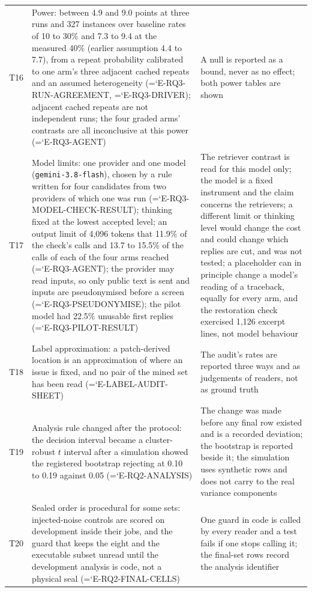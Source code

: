 \documentclass[10pt,twocolumn]{article}
\newcommand{\entry}[1]{{\ttfamily\hyphenchar\font=`\-\relax #1}}
\begin{document}
\begin{table}[t]
\begin{tabular}{@{}p{}p{}p{}@{}}
T16 & Power: between 4.9 and 9.0 points at three runs and 327 instances over baseline rates of 10 to 30\% and 7.3 to 9.4 at the measured 40\% (earlier assumption 4.4 to 7.7), from a repeat probability calibrated to one arm's three adjacent cached repeats and an assumed heterogeneity (\entry{E-RQ3-RUN-AGREEMENT}, \entry{E-RQ3-DRIVER}); adjacent cached repeats are not independent runs; the four graded arms' contrasts are all inconclusive at this power (\entry{E-RQ3-AGENT}) & A null is reported as a bound, never as no effect; both power tables are shown \\
T17 & Model limits: one provider and one model (\texttt{gemini-3.8-flash}), chosen by a rule written for four candidates from two providers of which one was run (\entry{E-RQ3-MODEL-CHECK-RESULT}); thinking fixed at the lowest accepted level; an output limit of 4,096 tokens that 11.9\% of the check's calls and 13.7 to 15.5\% of the calls of each of the four arms reached (\entry{E-RQ3-AGENT}); the provider may read inputs, so only public text is sent and inputs are pseudonymised before a screen (\entry{E-RQ3-PSEUDONYMISE}); the pilot model had 22.5\% unusable first replies (\entry{E-RQ3-PILOT-RESULT}) & The retriever contrast is read for this model only; the model is a fixed instrument and the claim concerns the retrievers; a different limit or thinking level would change the cost and could change which replies are cut, and was not tested; a placeholder can in principle change a model's reading of a traceback, equally for every arm, and the restoration check exercised 1,126 excerpt lines, not model behaviour \\
T18 & Label approximation: a patch-derived location is an approximation of where an issue is fixed, and no pair of the mined set has been read (\entry{E-LABEL-AUDIT-SHEET}) & The audit's rates are reported three ways and as judgements of readers, not as ground truth \\
T19 & Analysis rule changed after the protocol: the decision interval became a cluster-robust $t$ interval after a simulation showed the registered bootstrap rejecting at 0.10 to 0.19 against 0.05 (\entry{E-RQ2-ANALYSIS}) & The change was made before any final row existed and is a recorded deviation; the bootstrap is reported beside it; the simulation uses synthetic rows and does not carry to the real variance components \\
T20 & Sealed order is procedural for some sets: injected-noise controls are scored on development inside their jobs, and the guard that keeps the eight and the executable subset unread until the development analysis is code, not a physical seal (\entry{E-RQ2-FINAL-CELLS}) & One guard in code is called by every reader and a test fails if one stops calling it; the final-set rows record the analysis identifier \\

\end{tabular}
\end{table}
\end{document}
